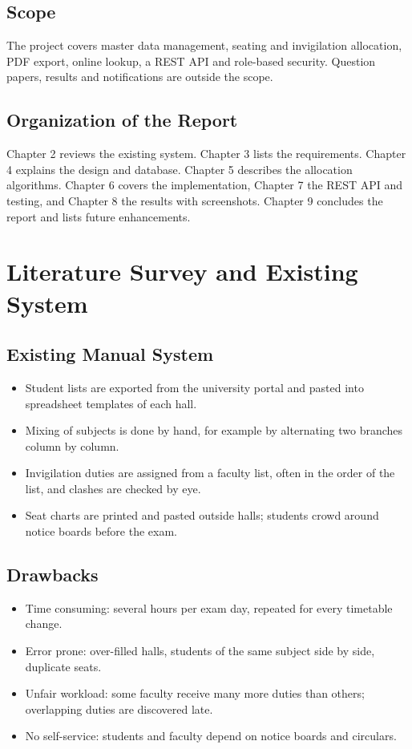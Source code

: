 \documentclass[12pt,a4paper,oneside]{report}
\begin{document}
\section{Scope}
The project covers master data management, seating and invigilation allocation, PDF export, online lookup, a REST API and role-based security. Question papers, results and notifications are outside the scope.

\section{Organization of the Report}
Chapter 2 reviews the existing system. Chapter 3 lists the requirements. Chapter 4 explains the design and database. Chapter 5 describes the allocation algorithms. Chapter 6 covers the implementation, Chapter 7 the REST API and testing, and Chapter 8 the results with screenshots. Chapter 9 concludes the report and lists future enhancements.

\chapter{Literature Survey and Existing System}
\section{Existing Manual System}
\begin{itemize}
  \item Student lists are exported from the university portal and pasted into spreadsheet templates of each hall.
  \item Mixing of subjects is done by hand, for example by alternating two branches column by column.
  \item Invigilation duties are assigned from a faculty list, often in the order of the list, and clashes are checked by eye.
  \item Seat charts are printed and pasted outside halls; students crowd around notice boards before the exam.
\end{itemize}
\section{Drawbacks}
\begin{itemize}
  \item Time consuming: several hours per exam day, repeated for every timetable change.
  \item Error prone: over-filled halls, students of the same subject side by side, duplicate seats.
  \item Unfair workload: some faculty receive many more duties than others; overlapping duties are discovered late.
  \item No self-service: students and faculty depend on notice boards and circulars.
\end{itemize}
\end{document}
